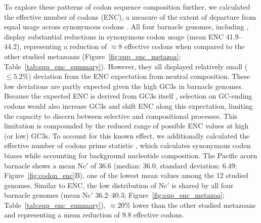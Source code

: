 To explore these patterns of codon sequence composition further, we calculated the effective
number of codons (ENC), a measure of the extent of departure from equal usage across
synonymous codons \citep{wright_effective_1990,sun_improved_2013}.
All four barnacle genomes, including \bgla{}, display substantial reductions in synonymous
codon usage (mean ENC 41.9--44.2), representing a reduction of $\approx8$ effective 
codons when compared to the other studied metazoans
(Figure~\ref{fig:sup_enc_metazoa}; Table~\ref{tab:sup_enc_summary}).
However, they all displayed relatively small ($\le5.2\%$) deviation from the ENC expectation
from neutral composition.
These low deviations are partly expected given the high GC3s in barnacle genomes.
Because the expected ENC is derived from GC3s itself \citep[i.e., Wright's curve;][]{wright_effective_1990},
selection on GC-ending codons would also increase GC3s and shift ENC along this expectation,
limiting the capacity to discern between selective and compositional processes.
This limitation is compounded by the reduced range of possible ENC values at high (or low)
GC3s.
To account for this known effect, we additionally calculated the effective number of codons
prime statistic \citep[Nc$'$;][]{novembre_2002_encprime}, which calculates synonymous codon
biases while accounting for background nucleotide composition.
The Pacific acorn barnacle shows a mean Nc$'$ of 36.6 (median: 36.0, standard deviation: 6.49;
Figure~\ref{fig:codon_enc}B), one of the lowest mean values among the 12 studied genomes.
Similar to ENC, the low distribution of Nc$'$ is shared by all four barnacle genomes (mean Nc$'$
36.2--40.3; Figure~\ref{fig:sup_enc_metazoa}; Table~\ref{tab:sup_enc_summary}), $\approx20\%$
lower than the other studied metazoans and representing a mean reduction of 9.8 effective codons.
\vspace{0.1cm}

